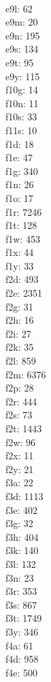 \begin{multicols}{8}
  \\e9l: 62
  \\e9m: 20
  \\e9n: 195
  \\e9s: 134
  \\e9t: 95
  \\e9y: 115
  \\f10g: 14
  \\f10n: 11
  \\f10s: 33
  \\f11s: 10
  \\f1d: 18
  \\f1e: 47
  \\f1g: 340
  \\f1n: 26
  \\f1o: 17
  \\f1r: 7246
  \\f1t: 128
  \\f1w: 453
  \\f1x: 44
  \\f1y: 33
  \\f2d: 493
  \\f2e: 2351
  \\f2g: 31
  \\f2h: 16
  \\f2i: 27
  \\f2k: 35
  \\f2l: 859
  \\f2m: 6376
  \\f2p: 28
  \\f2r: 444
  \\f2s: 73
  \\f2t: 1443
  \\f2w: 96
  \\f2x: 11
  \\f2y: 21
  \\f3a: 22
  \\f3d: 1113
  \\f3e: 402
  \\f3g: 32
  \\f3h: 404
  \\f3k: 140
  \\f3l: 132
  \\f3n: 23
  \\f3r: 353
  \\f3s: 867
  \\f3t: 1749
  \\f3y: 346
  \\f4a: 61
  \\f4d: 958
  \\f4e: 500

\end{multicols}
